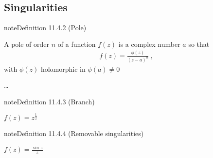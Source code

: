 \documentclass[letterpaper,10pt,english]{jupyterBook}
\begin{document}
\subsection{Singularities}
\label{\detokenize{ch/complex/analysis:singularities}}\label{\detokenize{ch/complex/analysis:complex-analysis-singularities}}\label{ch/complex/analysis:definition-2}
\begin{sphinxadmonition}{note}{Definition 11.4.2 (Pole)}



\sphinxAtStartPar
A pole of order \(n\) of a function \(f(z)\) is a complex number \(a\) so that
\begin{equation*}
\begin{split}f(z) = \frac{\phi(z)}{(z-a)^n} \ ,\end{split}
\end{equation*}
\sphinxAtStartPar
with \(\phi(z)\) holomorphic in \(\phi(a) \ne 0\)
\end{sphinxadmonition}

\sphinxAtStartPar
{} …
\label{ch/complex/analysis:definition-3}
\begin{sphinxadmonition}{note}{Definition 11.4.3 (Branch)}


\end{sphinxadmonition}

\sphinxAtStartPar
{} \(f(z) = z^{\frac{1}{2}}\)
\label{ch/complex/analysis:definition-4}
\begin{sphinxadmonition}{note}{Definition 11.4.4 (Removable singularities)}


\end{sphinxadmonition}

\sphinxAtStartPar
{} \(f(z) = \frac{\sin z}{z}\)

\sphinxAtStartPar
{}
\end{document}
